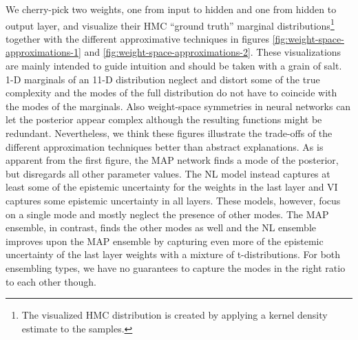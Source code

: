\documentclass[../thesis.tex]{subfiles}
\begin{document}
We cherry-pick two weights, one from input to hidden and one from hidden to output layer, and visualize their HMC ``ground truth'' marginal distributions\footnote{The visualized HMC distribution is created by applying a kernel density estimate to the samples.} together with the different approximative techniques in figures \ref{fig:weight-space-approximations-1} and \ref{fig:weight-space-approximations-2}. These visualizations are mainly intended to guide intuition and should be taken with a grain of salt. 1-D marginals of an 11-D distribution neglect and distort some of the true complexity and the modes of the full distribution do not have to coincide with the modes of the marginals. Also weight-space symmetries in neural networks can let the posterior appear complex although the resulting functions might be redundant. Nevertheless, we think these figures illustrate the trade-offs of the different approximation techniques better than abstract explanations. As is apparent from the first figure, the MAP network finds a mode of the posterior, but disregards all other parameter values. The NL model instead captures at least some of the epistemic uncertainty for the weights in the last layer and VI captures some epistemic uncertainty in all layers. These models, however, focus on a single mode and mostly neglect the presence of other modes. The MAP ensemble, in contrast, finds the other modes as well and the NL ensemble improves upon the MAP ensemble by capturing even more of the epistemic uncertainty of the last layer weights with a mixture of t-distributions. For both ensembling types, we have no guarantees to capture the modes in the right ratio to each other though.


% 
\end{document}
